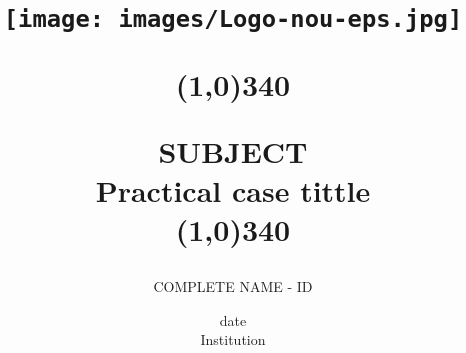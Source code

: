 \title{
	\begin{center}
	\vspace{3cm}
	\texttt{[image: images/Logo-nou-eps.jpg]}
	\end{center}
	\begin{center}
	\line(1,0){340}
	\end{center}		
	SUBJECT\\
	\vspace{2mm}
	\Large Practical case tittle\\
	\line(1,0){340}
	\vspace{2.5cm}
	}

\author{COMPLETE NAME - ID \vspace{1cm}}


\date{date\vspace{0.5cm} \\Institution}
